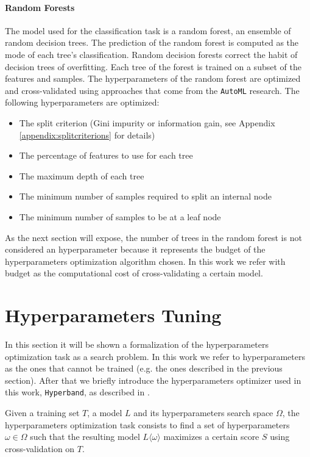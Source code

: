 \documentclass[11pt, a4paper]{article}
\begin{document}
  \paragraph{Random Forests}
    The model used for the classification task is a random forest, an ensemble of random decision trees. The prediction of the random forest is computed as the mode of each tree's classification. Random decision forests correct the habit of decision trees of overfitting. Each tree of the forest is trained on a subset of the features and samples. The hyperparameters of the random forest are optimized and cross-validated using approaches that come from the \texttt{AutoML} research. The following hyperparameters are optimized:
    \begin{itemize}
      \item The split criterion (Gini impurity or information gain, see Appendix \ref{appendix:splitcriterions} for details)
      \item The percentage of features to use for each tree
      \item The maximum depth of each tree
      \item The minimum number of samples required to split an internal node
      \item The minimum number of samples to be at a leaf node
    \end{itemize}
  As the next section will expose, the number of trees in the random forest is not considered an hyperparameter because it represents the budget of the hyperparameters optimization algorithm chosen. In this work we refer with budget as the computational cost of cross-validating a certain model.

\section{Hyperparameters Tuning}
  In this section it will be shown a formalization of the hyperparameters optimization task as a search problem. In this work we refer to hyperparameters as the ones that cannot be trained (e.g. the ones described in the previous section). After that we briefly introduce the hyperparameters optimizer used in this work, \texttt{Hyperband}, as described in \cite{hyperband}.

  Given a training set $T$, a model $L$ and its hyperparameters search space $\Omega$, the hyperparameters optimization task consists to find a set of hyperparameters $\omega \in \Omega$ such that the resulting model $L\langle\omega\rangle$ maximizes a certain score $S$ using cross-validation on $T$.
\end{document}
